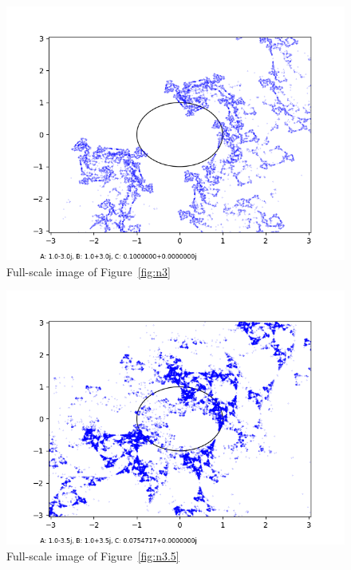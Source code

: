 \documentclass[12pt,a4paper,reqno,parskip=full]{amsart}
\numberwithin{equation}{section}
\theoremstyle{plain}
\theoremstyle{definition}
\begin{document}
\begin{figure}[H]
    \centering
    \includegraphics[width=\textwidth]{images/nn/a-3 b3 h40 d0.025.png}
    \caption{Full-scale image of Figure~\ref{fig:n3}}
\end{figure}

\begin{figure}[H]
    \centering
    \includegraphics[width=\textwidth]{images/nn/a-3.5 b3.5 h30 d0.01.png}
    \caption{Full-scale image of Figure~\ref{fig:n3.5}}
\end{figure}
\end{document}
